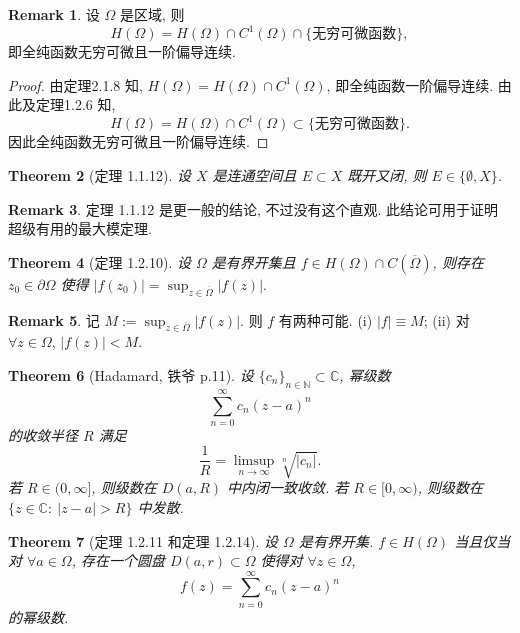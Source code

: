 \documentclass[a4paper,11pt]{article}
\newtheorem{theorem}{Theorem}[section]
\theoremstyle{definition}
\newtheorem{remark}[theorem]{Remark}
\begin{document}
\begin{remark}
    设 $ \Omega $ 是区域, 则 
    $$ 
        H(\Omega) = H(\Omega) \cap C^1(\Omega) \cap \{\text{无穷可微函数}\},
    $$
    即全纯函数无穷可微且一阶偏导连续.
\end{remark}

\begin{proof}
    由定理2.1.8 知, $ H(\Omega) = H(\Omega) \cap C^1(\Omega) $, 即全纯函数一阶偏导连续.
    由此及定理1.2.6 知,
    $$
        H(\Omega) = H(\Omega) \cap C^1(\Omega) \subset \{\text{无穷可微函数}\}.
    $$
    因此全纯函数无穷可微且一阶偏导连续.
\end{proof}

\begin{theorem}[定理 1.1.12]
    设 $ X $ 是连通空间且 $ E \subset X $ 既开又闭, 则 $ E \in \{\emptyset, X\} $.
\end{theorem}

\begin{remark}
    定理 1.1.12 是更一般的结论, 不过没有这个直观. 此结论可用于证明超级有用的最大模定理.
\end{remark}


\begin{theorem}[定理 1.2.10]
    设 $ \Omega $ 是有界开集且 $ f \in H(\Omega) \cap C(\overline{\Omega}) $, 
    则存在 $ z_0 \in \partial \Omega $ 使得
    $
        |f(z_0)| = \sup_{z \in \overline{\Omega}} |f(z)|.
    $
\end{theorem}

\begin{remark}
    记
    $
        M := \sup_{z \in \overline{\Omega}} |f(z)|.
    $
    则 $ f $ 有两种可能. (i) $ |f| \equiv M $; (ii) 对 $ \forall z \in \Omega $, $ |f(z)| < M $.
\end{remark}

\begin{theorem}[Hadamard, 铁爷 p.11]
    设 $ \{c_n\}_{n \in \mathbb{N}} \subset \mathbb{C} $, 幂级数
    $$
        \sum_{n=0}^\infty c_n (z - a)^n
    $$
    的收敛半径 $ R $ 满足
    $$
        \frac{1}{R} = \limsup_{n \to \infty} \sqrt[n]{|c_n|}.
    $$
    若 $ R \in (0, \infty] $, 则级数在 $ D(a, R) $ 中内闭一致收敛.
    若 $ R \in [0, \infty) $, 则级数在 $ \{z \in \mathbb{C} :\ |z - a| > R\} $ 中发散.
\end{theorem}

\begin{theorem}[定理 1.2.11 和定理 1.2.14]
    设 $ \Omega $ 是有界开集. 
    $ f \in H(\Omega) $ 当且仅当对 $ \forall a \in \Omega $, 存在一个圆盘 $ D(a, r) \subset \Omega $ 
    使得对 $ \forall z \in \Omega $,
    $$
        f(z) = \sum_{n=0}^\infty c_n (z - a)^n
    $$
    的幂级数.
\end{theorem}
\end{document}
